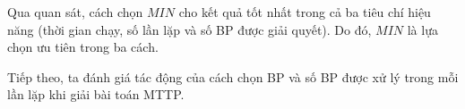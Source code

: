 \documentclass[../main.tex]{subfiles}
\begin{document}
Qua quan sát, cách chọn \(MIN\) cho kết quả tốt nhất trong cả ba tiêu
chí hiệu năng (thời gian chạy, số lần lặp và số BP được giải quyết). Do
đó, \(MIN\) là lựa chọn ưu tiên trong ba cách.

Tiếp theo, ta đánh giá tác động của cách chọn BP và số BP được xử lý
trong mỗi lần lặp khi giải bài toán MTTP.


\begin{figure}

  \centering
  \\


\end{figure}
\end{document}
